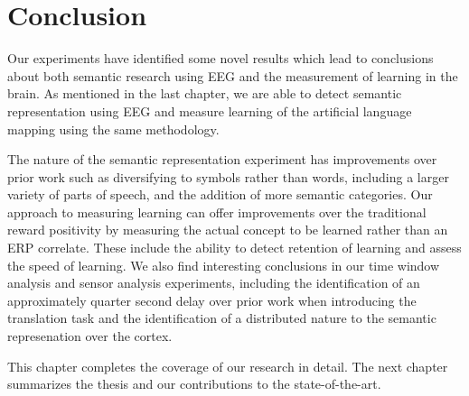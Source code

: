 \section{Conclusion}
Our experiments have identified some novel results which lead to conclusions 
about both semantic research using EEG and the measurement of learning in the 
brain. As mentioned in the last chapter, we are able to detect semantic 
representation using EEG and measure learning of the artificial language 
mapping using the same methodology. 

The nature of the semantic representation experiment has improvements over 
prior work such as diversifying to symbols rather than words, including a 
larger variety of parts of speech, and the addition of more semantic 
categories. Our approach to measuring learning can offer improvements over the 
traditional reward positivity by measuring the actual concept to be learned 
rather than an ERP correlate. These include the ability to detect retention of 
learning and assess the speed of learning. We also find interesting conclusions 
in our time window analysis and sensor analysis experiments, including the 
identification of an approximately quarter second delay over prior work when 
introducing the translation task and the identification of a distributed nature 
to the semantic represenation over the cortex. 

This chapter completes the coverage of our research in detail. The next chapter 
summarizes the thesis and our contributions to the state-of-the-art.
